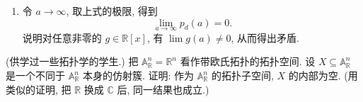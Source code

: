 \begin{BookExercises}
\begin{enumerate}[label=(\alph*)]
\[        \]
        其中 $p_{d}\ne0\in\mathbb{R}[x]$. 证明对所有 $a\in\mathbb{R}$ 都有
        \[
          \frac{p_{0}(a)}{e^{da}}+\frac{p_{1}(a)}{e^{(d-1)a}}+
          \frac{p_{2}(a)}{e^{(d-2)a}}+\cdots+
          \frac{p_{d-1}(a)}{e^{a}}+p_{d}(a)=0.
        \]
      \item 令 $a\to\infty$, 取上式的极限, 得到
        \[
          \lim_{a\to\infty}p_{d}(a)=0.
        \]
        说明对任意非零的 $g\in\mathbb{R}[x]$, 有 $\lim g(a)\ne0$, 从而得出矛盾.
    \end{enumerate}
  \item\label{ex:affine-variety-empty-interior} (供学过一些拓扑学的学生.) 把 $\mathbb{A}^{n}_{\mathbb{R}}=\mathbb{R}^{n}$ 看作带欧氏拓扑的拓扑空间. 设 $X\subseteq\mathbb{A}^{n}_{\mathbb{R}}$ 是一个不同于 $\mathbb{A}^{n}_{\mathbb{R}}$ 本身的仿射簇. 证明: 作为 $\mathbb{A}^{n}_{\mathbb{R}}$ 的拓扑子空间, $X$ 的内部为空. (用类似的证明, 把 $\mathbb{R}$ 换成 $\mathbb{C}$ 后, 同一结果也成立.)
\end{BookExercises}
